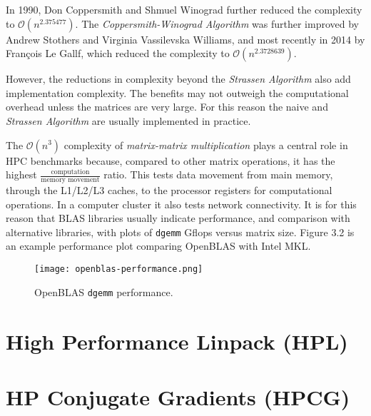 In 1990, Don Coppersmith and Shmuel Winograd further reduced the complexity to $\mathcal{O}(n^{2.375477})$. The \emph{Coppersmith-Winograd Algorithm} was further improved by Andrew Stothers and Virginia Vassilevska Williams, and most recently in 2014 by François Le Gallf, which reduced the complexity to $\mathcal {O}(n^{2.3728639})$.

However, the reductions in complexity beyond the \emph{Strassen Algorithm} also add implementation complexity. The benefits may not outweigh the computational overhead unless the matrices are very large. For this reason the naive and \emph{Strassen Algorithm} are usually implemented in practice.    

The $\mathcal{O}(n^3)$ complexity of \emph{matrix-matrix multiplication} plays a central role in HPC benchmarks because, compared to other matrix operations, it has the highest $\frac{\text{computation}}{\text{memory movement}}$ ratio. This tests data movement from main memory, through the L1/L2/L3 caches, to the processor registers for computational operations. In a computer cluster it also tests network connectivity. It is for this reason that BLAS libraries usually indicate performance, and comparison with alternative libraries, with plots of \verb|dgemm| Gflops versus matrix size. Figure 3.2 is an example performance plot comparing OpenBLAS with Intel MKL.

\begin{figure}[h]
	\centering	
	\texttt{[image: openblas-performance.png]}
	\caption{OpenBLAS \texttt{dgemm} performance.}
\end{figure}






%
%
\section{High Performance Linpack (HPL)}


%
%
\section{HP Conjugate Gradients (HPCG)}



